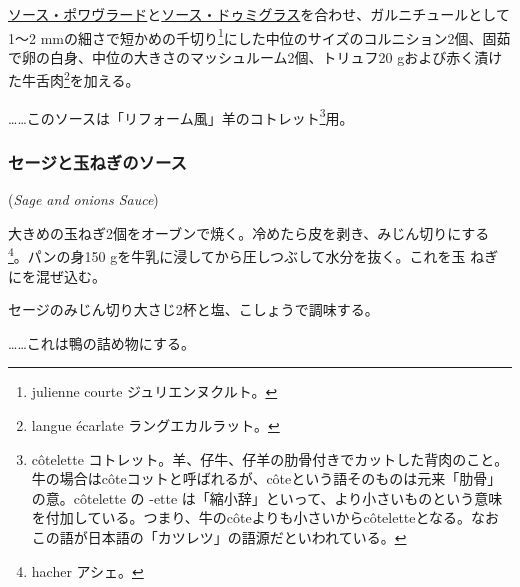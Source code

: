 \begin{recette}
\protect\hyperlink{sauce-poivrade}{ソース・ポワヴラード}と\protect\hyperlink{sauce-demi-glace}{ソース・ドゥミグラス}を合わせ、ガルニチュールとして1〜2
mmの細さで短かめの千切り\footnote{julienne courte ジュリエンヌクルト。}にした中位のサイズのコルニション2個、固茹で卵の白身、中位の大きさのマッシュルーム2個、トリュフ20
gおよび赤く漬けた牛舌肉\footnote{langue écarlate ラングエカルラット。}を加える。

\ldots{}\ldots{}このソースは「リフォーム風」羊のコトレット\footnote{côtelette
  コトレット。羊、仔牛、仔羊の肋骨付きでカットした背肉のこと。牛の場合はcôteコットと呼ばれるが、côteという語そのものは元来「肋骨」の意。côtelette
  の -ette
  は「縮小辞」といって、より小さいものという意味を付加している。つまり、牛のcôteよりも小さいからcôteletteとなる。なおこの語が日本語の「カツレツ」の語源だといわれている。}用。

\maeaki

\hypertarget{sage-and-onions-sauce}{%
\subsubsection{セージと玉ねぎのソース}\label{sage-and-onions-sauce}}

 (\emph{Sage and onions Sauce})


大きめの玉ねぎ2個をオーブンで焼く。冷めたら皮を剥き、みじん切りにする
\footnote{hacher アシェ。}。パンの身150
gを牛乳に浸してから圧しつぶして水分を抜く。これを玉 ねぎにを混ぜ込む。

セージのみじん切り大さじ2杯と塩、こしょうで調味する。

\ldots{}\ldots{}これは鴨の詰め物にする。


\end{recette}
